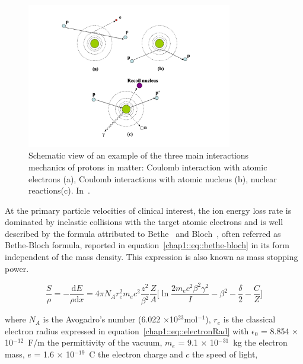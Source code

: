 \begin{figure}[!htbp]
\centering
\includegraphics[width=0.8\textwidth]{03_GraphicFiles/chapter1_Introduction/protonInteractions.pdf}
\caption{Schematic view of an example of the three main interactions mechanics of protons in matter: Coulomb interaction with atomic electrons (a), Coulomb interactions with atomic nucleus (b), nuclear reactions(c). In~\cite{Newhauser2015}.}
\label{chap1::fig::protInteractions}
\end{figure} 

At the primary particle velocities of clinical interest,   the ion energy loss rate is dominated by inelastic collisions with the target atomic electrons and is well described by the formula attributed to Bethe~\parencite{Bethe1930} and Bloch~\parencite{Bloch1933}, often referred as Bethe-Bloch formula, reported in equation~\ref{chap1::eq::bethe-bloch} in its form independent of the mass density. This expression is also known as mass stopping power.

\begin{equation}
\frac{S}{\rho} = -\frac{\mathrm{d}E}{\rho \mathrm{d}x} = 4\pi N_{A}r^{2}_{e}m_{e}c^{2}\frac{z^{2}}{\beta^{2}}\frac{Z}{A}\bigg[\ln{\frac{2m_{e}c^{2}\beta^{2}\gamma^{2}}{I}}-\beta^{2}-\frac{\delta}{2}-\frac{C}{Z}\bigg]
\label{chap1::eq::bethe-bloch}
\end{equation}

where $N_{A}$ is the Avogadro's number (6.022 $\times$10$^{23}$mol$^{-1}$), $r_{e}$ is the classical electron radius expressed in equation~\ref{chap1::eq::electronRad} with $\epsilon_{0}$ = 8.854 $\times$ 10$^{-12}$~F/m the permittivity of the vacuum, $m_{e}$ = 9.1 $\times$ 10$^{-31}$~kg the electron mass, $e$ = 1.6 $\times$ 10$^{-19}$~C the electron charge and $c$ the speed of light,  


